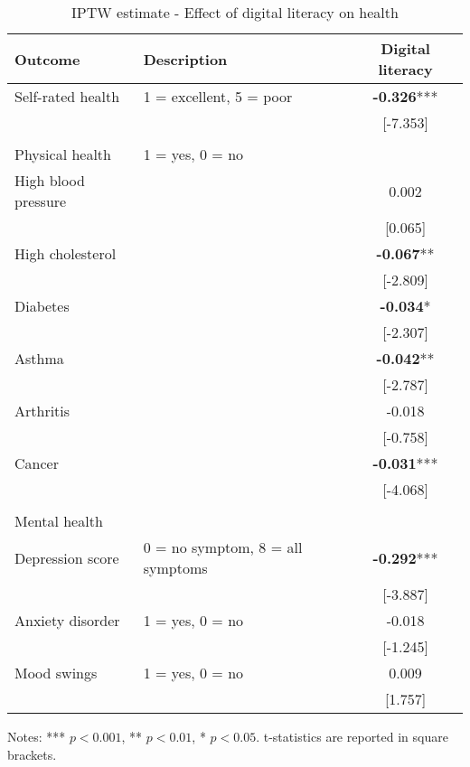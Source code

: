 \documentclass[11pt]{article}
\begin{document}
    \begin{table}[h!]
        \centering
        \caption{IPTW estimate - Effect of digital literacy on health}
        \label{tab:iptw}
        \begin{threeparttable}
            \begin{tabular}{llc}
                \toprule
                Outcome & Description & Digital literacy \\
                \midrule
                Self-rated health & 1 = excellent, 5 = poor & \textbf{-0.326}*** \\
                & & [-7.353] \\
                & & \\
                Physical health & 1 = yes, 0 = no & \\
                High blood pressure &  & 0.002 \\
                &  & [0.065] \\
                High cholesterol &  & \textbf{-0.067}** \\
                &  & [-2.809] \\
                Diabetes &  & \textbf{-0.034}* \\
                &  & [-2.307] \\
                Asthma &  & \textbf{-0.042}** \\
                &  & [-2.787] \\
                Arthritis &  & -0.018 \\
                &  & [-0.758] \\
                Cancer &  & \textbf{-0.031}*** \\
                &  & [-4.068] \\
                & & \\
                Mental health & & \\
                Depression score & 0 = no symptom, 8 = all symptoms & \textbf{-0.292}*** \\
                & & [-3.887] \\
                Anxiety disorder & 1 = yes, 0 = no  & -0.018 \\
                &  & [-1.245] \\
                Mood swings & 1 = yes, 0 = no  & 0.009 \\
                &  & [1.757] \\
                \bottomrule
            \end{tabular}
            \begin{tablenotes}
                \footnotesize
                \item Notes: *** $p < 0.001$, ** $p < 0.01$, * $p < 0.05$. t-statistics are reported in square brackets.
            \end{tablenotes}
        \end{threeparttable}
    \end{table}
\end{document}
